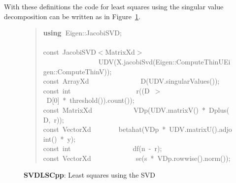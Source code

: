 \documentclass[shortnames,article]{jss}
\newcommand{\hlstd}[1]{\textcolor[rgb]{0,0,0}{#1}}
\newcommand{\hlnum}[1]{\textcolor[rgb]{0,0,0}{#1}}
\newcommand{\hlopt}[1]{\textcolor[rgb]{0,0,0}{#1}}
\newcommand{\hlkwa}[1]{\textcolor[rgb]{0.61,0.13,0.93}{\bf{#1}}}
\newcommand{\hlkwb}[1]{\textcolor[rgb]{0.13,0.54,0.13}{#1}}
\newcommand{\hlkwd}[1]{\textcolor[rgb]{0,0,0}{#1}}
\begin{document}
With these definitions the code for least squares using the singular
value decomposition can be written as in Figure~\ref{SVDLS}.
\begin{figure}[htb]
  \begin{quote}
    \noindent
    \ttfamily
    \hlstd{}\hlkwa{using\ }\hlstd{Eigen}\hlopt{::}\hlstd{JacobiSVD}\hlopt{;}\hspace*{\fill}\\
    \hlstd{}\hspace*{\fill}\\
    \hlkwb{const\ }\hlstd{JacobiSVD}\hlopt{$<$}\hlstd{MatrixXd}\hlopt{$>$}\hspace*{\fill}\\
    \hlstd{}\hlstd{\ \ \ \ \ \ \ \ \ \ \ \ \ \ \ \ }\hlstd{}\hlkwd{UDV}\hlstd{}\hlopt{(}\hlstd{X}\hlopt{.}\hlstd{}\hlkwd{jacobiSvd}\hlstd{}\hlopt{(}\hlstd{Eigen}\hlopt{::}\hlstd{ComputeThinU}\hlopt{\textbar }\hlstd{Eigen}\hlopt{::}\hlstd{ComputeThinV}\hlopt{));}\hspace*{\fill}\\
    \hlstd{}\hlkwb{const\ }\hlstd{ArrayXd}\hlstd{\ \ \ \ \ \ \ \ \ \ \ \ \ \ \ }\hlstd{}\hlkwd{D}\hlstd{}\hlopt{(}\hlstd{UDV}\hlopt{.}\hlstd{}\hlkwd{singularValues}\hlstd{}\hlopt{());}\hspace*{\fill}\\
    \hlstd{}\hlkwb{const\ int}\hlstd{\ \ \ \ \ \ \ \ \ \ \ \ \ \ \ \ \ \ \ }\hlkwb{}\hlstd{}\hlkwd{r}\hlstd{}\hlopt{((}\hlstd{D\ }\hlopt{$>$\ }\hlstd{D}\hlopt{{[}}\hlstd{}\hlnum{0}\hlstd{}\hlopt{{]}\ {*}\ }\hlstd{}\hlkwd{threshold}\hlstd{}\hlopt{()).}\hlstd{}\hlkwd{count}\hlstd{}\hlopt{());}\hspace*{\fill}\\
    \hlstd{}\hlkwb{const\ }\hlstd{MatrixXd}\hlstd{\ \ \ \ \ \ \ \ \ \ \ \ }\hlstd{}\hlkwd{VDp}\hlstd{}\hlopt{(}\hlstd{UDV}\hlopt{.}\hlstd{}\hlkwd{matrixV}\hlstd{}\hlopt{()\ {*}\ }\hlstd{}\hlkwd{Dplus}\hlstd{}\hlopt{(}\hlstd{D}\hlopt{,\ }\hlstd{r}\hlopt{));}\hspace*{\fill}\\
    \hlstd{}\hlkwb{const\ }\hlstd{VectorXd}\hlstd{\ \ \ \ \ \ \ \ }\hlstd{}\hlkwd{betahat}\hlstd{}\hlopt{(}\hlstd{VDp\ }\hlopt{{*}\ }\hlstd{UDV}\hlopt{.}\hlstd{}\hlkwd{matrixU}\hlstd{}\hlopt{().}\hlstd{}\hlkwd{adjoint}\hlstd{}\hlopt{()\ {*}\ }\hlstd{y}\hlopt{);}\hspace*{\fill}\\
    \hlstd{}\hlkwb{const\ int}\hlstd{\ \ \ \ \ \ \ \ \ \ \ \ \ \ \ \ \ \ }\hlkwb{}\hlstd{}\hlkwd{df}\hlstd{}\hlopt{(}\hlstd{n\ }\hlopt{{-}\ }\hlstd{r}\hlopt{);}\hspace*{\fill}\\
    \hlstd{}\hlkwb{const\ }\hlstd{VectorXd}\hlstd{\ \ \ \ \ \ \ \ \ \ \ \ \ }\hlstd{}\hlkwd{se}\hlstd{}\hlopt{(}\hlstd{s\ }\hlopt{{*}\ }\hlstd{VDp}\hlopt{.}\hlstd{}\hlkwd{rowwise}\hlstd{}\hlopt{().}\hlstd{}\hlkwd{norm}\hlstd{}\hlopt{());}\hlstd{}\hspace*{\fill}
    \normalfont
    \normalsize
  \end{quote}
  \caption{\textbf{SVDLSCpp}: Least squares using the SVD}
  \label{SVDLS}
\end{figure}
\end{document}
